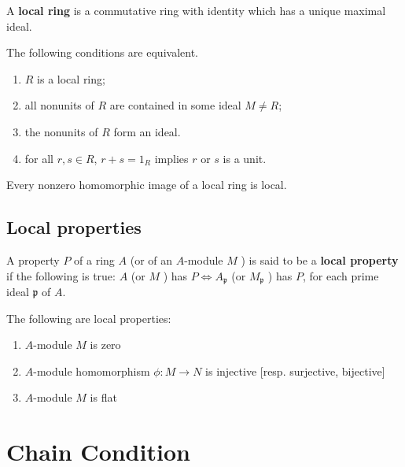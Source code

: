 \begin{definition}
    A \textbf{local ring} is a commutative ring with identity which has a unique maximal ideal.
\end{definition}

\begin{theorem}
    The following conditions are equivalent.
    \begin{enumerate}
        \item
              $R$ is a local ring;
        \item
              all nonunits of $R$ are contained in some ideal $M \neq R$;
        \item
              the nonunits of $R$ form an ideal.

        \item for all $r, s \in R$, $r + s = 1_R$ implies $r$ or $s$ is a unit.
    \end{enumerate}
\end{theorem}

\begin{proposition}
    Every nonzero homomorphic image of a local ring is local.
\end{proposition}
\section{Local properties}
\begin{definition}
    A property $P$ of a ring $A$ (or of an $A$-module $M$ ) is said to be a \textbf{local property} if the following is true:
    $A$ (or $M$ ) has $P \Leftrightarrow A_{\mathfrak{p}}$ (or $M_{\mathfrak{p}}$ ) has $P$, for each prime ideal $\mathfrak{p}$ of $A$.
\end{definition}

\begin{proposition}
    The following are local properties:
    \begin{enumerate}
        \item $A$-module $M$ is zero
        \item $A$-module homomorphism $\phi:M\rightarrow N$ is injective [resp. surjective, bijective]
        \item $A$-module $M$ is flat
    \end{enumerate}
\end{proposition}

\chapter{Chain Condition} %
\label{Chain Condition}

